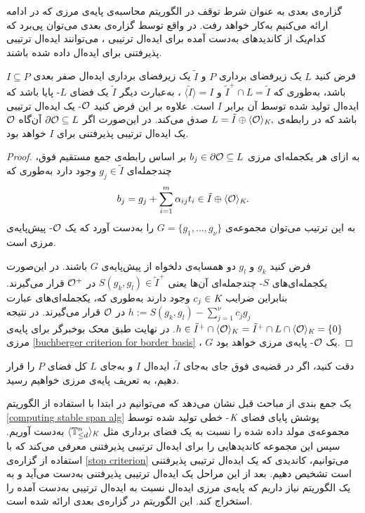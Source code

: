 گزاره‌ی بعدی به عنوان شرط توقف در الگوریتم محاسبه‌ی پایه‌ی مرزی که در ادامه ارائه می‌کنیم به‌کار خواهد رفت. در واقع توسط گزاره‌ی بعدی می‌توان پی‌برد که کدام‌یک از کاندید‌های به‌دست  آمده برای ایده‌ال ترتیبی ، می‌توانند ایده‌ال ترتیبی پذیرفتنی برای ایده‌ال داده شده باشند.

\begin{proposition}
	\label{stop criterion}
	فرض کنید 
	$L$
	یک زیرفضای برداری 
	$P$
	و 
	$\tilde{I}$
 یک زیرفضای برداری ایده‌ال صفر بعدی 
	$I\subseteq P$
	باشد، به‌طوری که 
	$\tilde{I}^{+}\cap L = \tilde{I}$
	و
	$\langle \tilde{I} \rangle = I$
	، به‌عبارت دیگر 
	$\tilde{I}$
	یک فضای 
	$L$-
	پایا باشد که ایده‌ال تولید شده توسط آن برابر 
	$I$
است. علاوه بر این فرض کنید 
${\mathcal O}$-
یک ایده‌ال ترتیبی باشد که در رابطه‌ی 
$L = \tilde{I}\oplus \langle {\mathcal O}\rangle_{\textit{K}},$
صدق می‌کند. در این‌صورت اگر 
$\partial\mathcal{O}\subseteq L$
آن‌گاه 
${\mathcal O}$
یک ایده‌ال ترتیبی پذیرفتنی برای 
$I$
خواهد بود.
\end{proposition}
\begin{proof}
به ازای هر یکجمله‌ای مرزی 
$b_{j}\in\partial\mathcal{O}\subseteq L$
بر اساس  رابطه‌ی جمع مستقیم فوق، چندجمله‌ای 
$g_{j}\in \tilde{I}$
وجود دارد به‌طوری که 
$$b_{j} = g_{j} + \sum_{i = 1}^{m}\alpha_{ij}t_{i}\in\tilde{I}\oplus \langle{\mathcal O}\rangle_{\textit{K}}.$$
به این ترتیب می‌توان مجموعه‌ی 
$G = \{g_{1},...,g_{\nu	}\}$
را به‌دست  آورد که یک 
${\mathcal O}$-
پیش‌پایه‌ی مرزی است.

فرض کنید 
$g_{k}$
و
$g_{l}$
دو همسایه‌ی دلخواه از پیش‌پایه‌ی 
$G$
باشند. در این‌صورت یکجمله‌ای‌های 
$S$-
چندجمله‌ای‌ آن‌ها یعنی 
$S(g_{k}, g_{l})\in\tilde{I}^{+}$
در 
${\mathcal O}^{+}$
قرار می‌گیرند. بنابراین ضرایب 
$c_{j}\in\textit{K}$
وجود دارند به‌طوری که، یکجمله‌ای‌های عبارت 
$h:= S(g_{k},g_{l}) - \sum_{j = 1}^{\nu}c_{j}g_{j}$
در 
${\mathcal O}$
قرار می‌گیرند. در نتیجه 
$h\in \tilde{I}^{+}\cap\langle {\mathcal O}\rangle_{K} = \tilde{I}^{+}\cap L\cap\langle {\mathcal O}\rangle_{\textit{K}} = \{0\}$.
در نهایت طبق محک بوخبرگر برای پایه‌ی مرزی
\ref{buchberger criterion for border basis}
، 
$G$
یک 
${\mathcal O}$-
پایه‌ی مرزی خواهد بود.
\end{proof}
دقت کنید، اگر در قضیه‌ی فوق جای به‌جای 
$\tilde{I}$،
ایده‌ال 
$I$
و به‌جای 
$L$
کل فضای 
$P$
را قرار دهیم، به تعریف پایه‌ی مرزی خواهیم رسید.

یک جمع بندی از مباحث قبل نشان می‌دهد که می‌توانیم در ابتدا با استفاده از الگوریتم 
\ref{computing stable span alg}
پوشش پایای فضای 
$\textit{K}$-
خطی تولید شده توسط مجموعه‌ی مولد داده شده را  نسبت به یک فضای برداری مثل 
$\langle{\mathbb{T}}^{n}_{\leq d} \rangle_{\textit{K}}$
به‌دست  آوریم. سپس این مجموعه کاندید‌هایی را برای ایده‌ال ترتیبی پذیرفتنی معرفی می‌کند که با استفاده از گزاره‌ی 
\ref{stop criterion}
می‌توانیم، کاندیدی که یک ایده‌ال ترتیبی پذیرفتنی است تشخیص دهیم. بعد از این مراحل یک ایده‌ال ترتیبی پذیرفتنی به‌دست  می‌آید و به یک الگوریتم نیاز داریم که پایه‌ی مرزی ایده‌ال نسبت به ایده‌ال ترتیبی به‌دست  آمده را استخراج کند. این الگوریتم در گزاره‌ی بعدی ارائه شده است.

